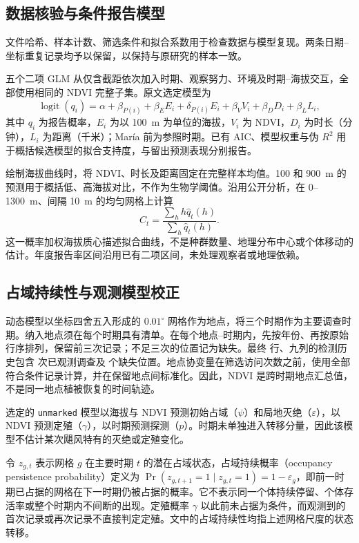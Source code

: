 \subsection{数据核验与条件报告模型}
\label{sec:verify}
文件哈希、样本计数、筛选条件和拟合系数用于检查数据与模型复现。两条日期--坐标重复记录均予以保留，以保持与原研究的样本一致。


五个二项 GLM 从仅含截距依次加入时期、观察努力、环境及时期--海拔交互，全部使用相同的 NDVI 完整子集。原文选定模型为
\begin{equation}
\operatorname{logit}(q_i)=\alpha+\beta_{P(i)}+\beta_E E_i+\delta_{P(i)}E_i+\beta_V V_i+\beta_D D_i+\beta_L L_i,
\label{eq:glm}
\end{equation}
其中 $q_i$ 为报告概率，$E_i$ 为以 100~m 为单位的海拔，$V_i$ 为 NDVI，$D_i$ 为时长（分钟），$L_i$ 为距离（千米）；María 前为参照时期。已有 AIC、模型权重与伪 $R^2$ 用于概括候选模型的拟合支持度\cite{burnham2002,mcfadden1974}，与留出预测表现分别报告。

绘制海拔曲线时，将 NDVI、时长及距离固定在完整样本均值。100 和 900~m 的预测用于概括低、高海拔对比，不作为生物学阈值。沿用公开分析，在 0--1300~m、间隔 10~m 的均匀网格上计算
\begin{equation}
C_t=\frac{\sum_h h\widehat q_t(h)}{\sum_h\widehat q_t(h)}.
\end{equation}
这一概率加权海拔质心描述拟合曲线，不是种群数量、地理分布中心或个体移动的估计。年度报告率区间沿用已有二项区间，未处理观察者或地理依赖。

\subsection{占域持续性与观测模型校正}
\label{sec:ordering}
动态模型以坐标四舍五入形成的 $0.01^\circ$ 网格作为地点，将三个时期作为主要调查时期。纳入地点须在每个时期具有清单。在每个地点--时期内，先按年份、再按原始行序排列，保留前三次记录；不足三次的位置记为缺失。最终 \nOccSites{} 行、九列的检测历史包含 \nOccasions{} 次已观测调查及 \nOccMissing{} 个缺失位置。地点协变量在筛选访问次数之前，使用全部符合条件记录计算，并在保留地点间标准化。因此，NDVI 是跨时期地点汇总值，不是同一地点植被恢复的时间轨迹。

选定的 \texttt{unmarked} 模型\cite{fiske2011}以海拔与 NDVI 预测初始占域（$\psi$）和局地灭绝（$\varepsilon$），以 NDVI 预测定殖（$\gamma$），以时期预测探测（$p$）。时期未单独进入转移分量，因此该模型不估计某次飓风特有的灭绝或定殖变化。

令 $z_{g,t}$ 表示网格 $g$ 在主要时期 $t$ 的潜在占域状态，占域持续概率（occupancy persistence probability）定义为 $\Pr(z_{g,t+1}=1\mid z_{g,t}=1)=1-\varepsilon_g$，即前一时期已占据的网格在下一时期仍被占据的概率\cite{mackenzie2003}。它不表示同一个体持续停留、个体存活率或整个时期内不间断的出现。定殖概率 $\gamma$ 以此前未占据为条件，而观测到的首次记录或再次记录不直接判定定殖。文中的占域持续性均指上述网格尺度的状态转移。

